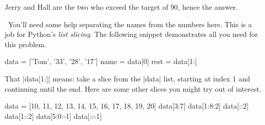 \medskip
Jerry and Hall are the two who exceed the target of 90, hence the answer.

\Scratch\ You'll need some help separating the names from the numbers here. This is a job
for Python's \emph{list slicing}. The following snippet demonstrates all you need for this
problem.

\begin{pythoncode}
  data = ['Tom', '33', '28', '17']
  name = data[0]
  rest = data[1:]
\end{pythoncode}

That \pycode|data[1:]| means: take a slice from the \pycode|data| list, starting at index
1 and continuing until the end. Here are some other slices you might try out of interest.

\begin{pythoncode}
  data = [10, 11, 12, 13, 14, 15, 16, 17, 18, 19, 20]
  data[3:7]
  data[1:8:2]
  data[::2]
  data[1::2]
  data[5:0:-1]
  data[::-1]
\end{pythoncode}

